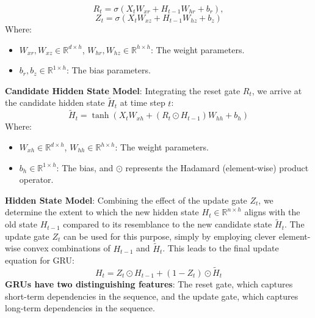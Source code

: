 \documentclass{ieeeojies}
\begin{document}
\[
R_t = \sigma(X_t W_{xr} + H_{t-1} W_{hr} + b_r),
\]
\[
Z_t = \sigma(X_t W_{xz} + H_{t-1} W_{hz} + b_z)
\]
Where:
\begin{itemize}
  \item \( W_{xr}, W_{xz} \in \mathbb{R}^{d \times h} \), \( W_{hr}, W_{hz} \in \mathbb{R}^{h \times h} \): The weight parameters.
  \item \( b_r, b_z \in \mathbb{R}^{1 \times h} \): The bias parameters.
\end{itemize}
\textbf{Candidate Hidden State Model}: Integrating the reset gate \( R_t \), we arrive at the candidate hidden state \( \tilde{H}_t \) at time step \( t \):
\[
\tilde{H}_t = \tanh(X_t W_{xh} + (R_t \odot H_{t-1}) W_{hh} + b_h)
\]
Where:
\begin{itemize}
  \item \( W_{xh} \in \mathbb{R}^{d \times h} \), \( W_{hh} \in \mathbb{R}^{h \times h} \): The weight parameters.
  \item \( b_h \in \mathbb{R}^{1 \times h} \): The bias, and \( \odot \) represents the Hadamard (element-wise) product operator.
\end{itemize}
\textbf{Hidden State Model}: Combining the effect of the update gate \( Z_t \), we determine the extent to which the new hidden state \( H_t \in \mathbb{R}^{n \times h} \) aligns with the old state \( H_{t-1} \) compared to its resemblance to the new candidate state \( \tilde{H}_t \). The update gate \( Z_t \) can be used for this purpose, simply by employing clever element-wise convex combinations of \( H_{t-1} \) and \( \tilde{H}_t \). This leads to the final update equation for GRU:
\[
H_t = Z_t \odot H_{t-1} + (1 - Z_t) \odot \tilde{H}_t
\] 
\textbf{GRUs have two distinguishing features}: The reset gate, which captures short-term dependencies in the sequence, and the update gate, which captures long-term dependencies in the sequence.
\end{document}
